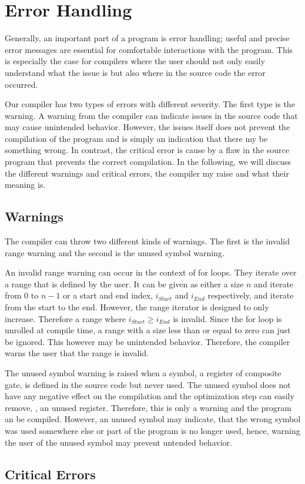 \section{Error Handling}
Generally, an important part of a program is error handling; useful and precise error messages are essential for comfortable interactions with the program. This is especially the case for compilers where the user should not only easily understand what the issue is but also where in the source code the error occurred.  

Our compiler has two types of errors with different severity. The first type is the warning. A warning from the compiler can indicate issues in the source code that may cause unintended behavior. However, the issues itself does not prevent the compilation of the program and is simply an indication that there my be something wrong. In contrast, the critical error is cause by a flaw in the source program that prevents the correct compilation. In the following, we will discuss the different warnings and critical errors, the compiler my raise and what their meaning is.

\subsection{Warnings}
The compiler can throw two different kinds of warnings. The first is the invalid range warning and the second is the unused symbol warning.

An invalid range warning can occur in the context of for loops. They iterate over a range that is defined by the user. It can be given as either a size $n$ and iterate from $0$ to $n-1$ or a start and end index, $i_{Start}$ and $i_{End}$ respectively, and iterate from the start to the end. However, the range iterator is designed to only increase. Therefore a range where $i_{Start} \geq i_{End}$ is invalid. Since the for loop is unrolled at compile time, a range with a size less than or equal to zero can just be ignored. This however may be unintended behavior. Therefore, the compiler warns the user that the range is invalid.

The unused symbol warning is raised when a symbol, \eg a register of composite gate, is defined in the source code but never used. The unused symbol does not have any negative effect on the compilation and the optimization step can easily remove, \eg, an unused register. Therefore, this is only a warning and the program an be compiled. However, an unused symbol may indicate, that the wrong symbol was used somewhere else or part of the program is no longer used, hence, warning the user of the unused symbol may prevent untended behavior.

\subsection{Critical Errors}